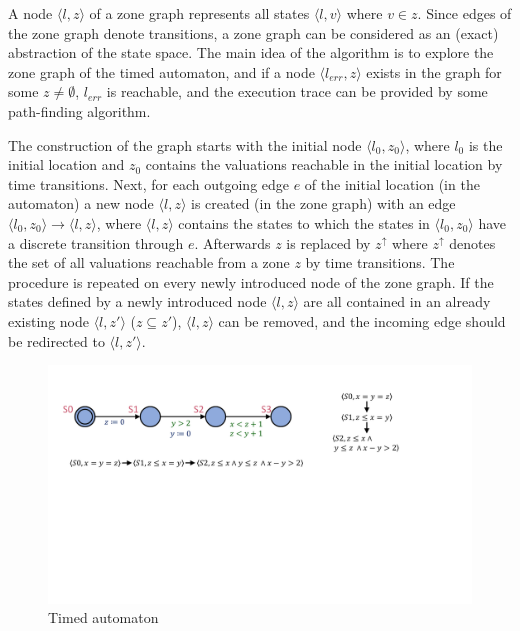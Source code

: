 A node $\langle l,z \rangle$ of a zone graph represents all states $\langle l,v \rangle$ where $v \in z$. Since edges of the zone graph denote transitions, a zone graph can be considered as an (exact) abstraction of the state space. The main idea of the algorithm is to explore the zone graph of the timed automaton, and if a node $\langle l_{err},z \rangle$ exists in the graph for some $z \neq \emptyset$, $l_{err}$ is reachable, and the execution trace can be provided by some path-finding algorithm.

The construction of the graph starts with the initial node  $\langle l_0,z_0 \rangle$,
where $l_0$ is the initial location and $z_0$ contains the valuations reachable in the initial location by time transitions. 
Next, for each outgoing edge $e$ of the initial location (in the automaton) a new node  $\langle l,z \rangle$ is created (in the zone graph) with an edge
$\langle l_0,z_0 \rangle \to \langle l,z \rangle$, where $\langle l,z \rangle$ contains the states to which the states in $\langle l_0,z_0 \rangle$ have a discrete transition through $e$. Afterwards $z$ is replaced by $z^\uparrow$ where $z^\uparrow$ denotes the set of all valuations reachable from a zone $z$ by time transitions.  The procedure is repeated on every newly introduced node of the zone graph. If the states defined by a newly introduced node $\langle l,z \rangle$ are all contained in an already existing node $\langle l,z' \rangle$ ($z \subseteq z'$), $\langle l,z \rangle$ can be removed, and the incoming edge should be redirected to $\langle l,z' \rangle$.

\begin{figure} 
	\centering
	\includegraphics[width=.7\textwidth]{include/figures/splitexample_aut}
	\caption{Timed automaton}
	\label{fig:splitex}
\end{figure}

